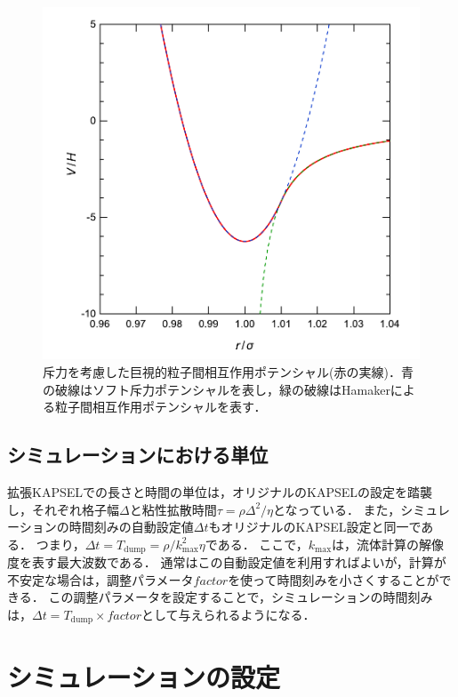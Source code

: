 \documentclass[pdflatex,a4paper,10pt,ja=standard]{bxjsarticle}
\begin{document}
\begin{figure}[htbp]
    \centering
    \includegraphics[width=10truecm]{hamaker.pdf}
    \caption{
        斥力を考慮した巨視的粒子間相互作用ポテンシャル(赤の実線)．青の破線はソフト斥力ポテンシャルを表し，緑の破線はHamakerによる粒子間相互作用ポテンシャルを表す．}
    \label{fig:hamaker}
\end{figure}

\subsection{シミュレーションにおける単位}
\label{sec:simulation_unit}
拡張KAPSELでの長さと時間の単位は，オリジナルのKAPSELの設定を踏襲し，それぞれ格子幅$\Delta$と粘性拡散時間$\tau = \rho \Delta^2 / \eta$となっている．
また，シミュレーションの時間刻みの自動設定値$\Delta t$もオリジナルのKAPSEL設定と同一である．
つまり，$\Delta t = T_{\mathrm {dump}} = \rho / k_{\mathrm{max}}^2 \eta$である．
ここで，$k_{\mathrm{max}}$は，流体計算の解像度を表す最大波数である．
通常はこの自動設定値を利用すればよいが，計算が不安定な場合は，調整パラメータ$factor$を使って時間刻みを小さくすることができる．
この調整パラメータを設定することで，シミュレーションの時間刻みは，$\Delta t = T_{\mathrm {dump}} \times factor$として与えられるようになる．

\section{シミュレーションの設定}
\end{document}
